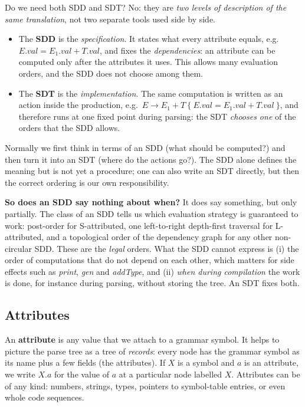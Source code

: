\documentclass[11pt,a4paper]{article}
\newcommand{\at}[2]{\ensuremath{#1.\mathit{#2}}}
\begin{document}
\begin{notebox}{Do we need both SDD and SDT?}
No: they are \emph{two levels of description of the same translation}, not two separate tools used side by side.
\begin{itemize}[nosep]
\item The \textbf{SDD} is the \emph{specification}. It states what every attribute equals, e.g.\ $\at{E}{val}=\at{E_1}{val}+\at{T}{val}$, and fixes the \emph{dependencies}: an attribute can be computed only after the attributes it uses. This allows many evaluation orders, and the SDD does not choose among them.
\item The \textbf{SDT} is the \emph{implementation}. The same computation is written as an action inside the production, e.g.\ $E \to E_1 + T\ \{\ \at{E}{val}=\at{E_1}{val}+\at{T}{val}\ \}$, and therefore runs at one fixed point during parsing: the SDT \emph{chooses one} of the orders that the SDD allows.
\end{itemize}
Normally we first think in terms of an SDD (what should be computed?) and then turn it into an SDT (where do the actions go?). The SDD alone defines the meaning but is not yet a procedure; one can also write an SDT directly, but then the correct ordering is our own responsibility.

\textbf{So does an SDD say nothing about when?} It does say something, but only partially. The class of an SDD tells us which evaluation strategy is guaranteed to work: post-order for S-attributed, one left-to-right depth-first traversal for L-attributed, and a topological order of the dependency graph for any other non-circular SDD. These are the \emph{legal} orders. What the SDD cannot express is (i) the order of computations that do not depend on each other, which matters for side effects such as \textit{print}, \textit{gen} and \textit{addType}, and (ii) \emph{when during compilation} the work is done, for instance during parsing, without storing the tree. An SDT fixes both.
\end{notebox}

\subsection{Attributes}
An \textbf{attribute} is any value that we attach to a grammar symbol. It helps to picture the parse tree as a tree of \emph{records}: every node has the grammar symbol as its name plus a few fields (the attributes). If $X$ is a symbol and $a$ is an attribute, we write $X.a$ for the value of $a$ at a particular node labelled $X$. Attributes can be of any kind: numbers, strings, types, pointers to symbol-table entries, or even whole code sequences.
\end{document}
